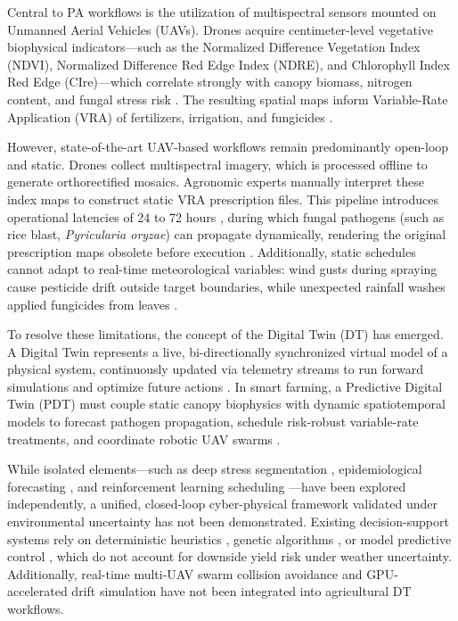 \documentclass[review,3p,times,authoryear]{elsarticle}
\begin{document}
Central to PA workflows is the utilization of multispectral sensors mounted on Unmanned Aerial Vehicles (UAVs). Drones acquire centimeter-level vegetative biophysical indicators---such as the Normalized Difference Vegetation Index (NDVI), Normalized Difference Red Edge Index (NDRE), and Chlorophyll Index Red Edge (CIre)---which correlate strongly with canopy biomass, nitrogen content, and fungal stress risk \citep{zheng2018, bonfil2004}. The resulting spatial maps inform Variable-Rate Application (VRA) of fertilizers, irrigation, and fungicides \citep{mulla2013}.

However, state-of-the-art UAV-based workflows remain predominantly open-loop and static. Drones collect multispectral imagery, which is processed offline to generate orthorectified mosaics. Agronomic experts manually interpret these index maps to construct static VRA prescription files. This pipeline introduces operational latencies of 24 to 72 hours \citep{torres2015}, during which fungal pathogens (such as rice blast, \textit{Pyricularia oryzae}) can propagate dynamically, rendering the original prescription maps obsolete before execution \citep{savary2019}. Additionally, static schedules cannot adapt to real-time meteorological variables: wind gusts during spraying cause pesticide drift outside target boundaries, while unexpected rainfall washes applied fungicides from leaves \citep{grella2019}.

To resolve these limitations, the concept of the Digital Twin (DT) has emerged. A Digital Twin represents a live, bi-directionally synchronized virtual model of a physical system, continuously updated via telemetry streams to run forward simulations and optimize future actions \citep{grieves2017, verdouw2021}. In smart farming, a Predictive Digital Twin (PDT) must couple static canopy biophysics with dynamic spatiotemporal models to forecast pathogen propagation, schedule risk-robust variable-rate treatments, and coordinate robotic UAV swarms \citep{pylianidis2021}.

While isolated elements---such as deep stress segmentation \citep{chen2018deeplab, sa2016deepfruits}, epidemiological forecasting \citep{gilligan2008, parnell2006}, and reinforcement learning scheduling \citep{yang2020, geng2023multiagent}---have been explored independently, a unified, closed-loop cyber-physical framework validated under environmental uncertainty has not been demonstrated. Existing decision-support systems rely on deterministic heuristics \citep{stafford2000, balafoutis2017}, genetic algorithms \citep{goldberg1989}, or model predictive control \citep{camacho2007}, which do not account for downside yield risk under weather uncertainty. Additionally, real-time multi-UAV swarm collision avoidance and GPU-accelerated drift simulation have not been integrated into agricultural DT workflows.
\end{document}
